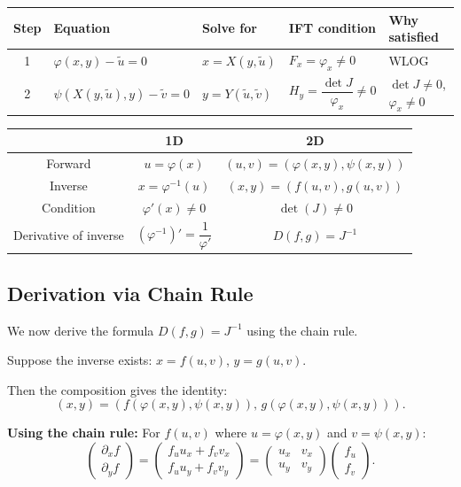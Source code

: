 \documentclass[11pt]{report}
\begin{document}
\begin{remark}
\begin{center}
\begin{tabular}{|c|l|l|l|l|}
\hline
\textbf{Step} & \textbf{Equation} & \textbf{Solve for} & \textbf{IFT condition} & \textbf{Why satisfied} \\
\hline
1 & $\varphi(x,y) - \tilde{u} = 0$ & $x = X(y, \tilde{u})$ & $F_x = \varphi_x \neq 0$ & WLOG \\
\hline
2 & $\psi(X(y,\tilde{u}),y) - \tilde{v} = 0$ & $y = Y(\tilde{u}, \tilde{v})$ & $H_y = \dfrac{\det J}{\varphi_x} \neq 0$ & $\det J \neq 0$, $\varphi_x \neq 0$ \\[6pt]
\hline
\end{tabular}
\end{center}
\end{remark}

\begin{remark}[Comparison: 1D vs 2D]
\begin{center}
\begin{tabular}{|c|c|c|}
\hline
& \textbf{1D} & \textbf{2D} \\
\hline
Forward & $u = \varphi(x)$ & $(u, v) = (\varphi(x,y), \psi(x,y))$ \\
\hline
Inverse & $x = \varphi^{-1}(u)$ & $(x, y) = (f(u, v), g(u, v))$ \\
\hline
Condition & $\varphi'(x) \neq 0$ & $\det(J) \neq 0$ \\
\hline
Derivative of inverse & $(\varphi^{-1})' = \dfrac{1}{\varphi'}$ & $D(f, g) = J^{-1}$ \\
\hline
\end{tabular}
\end{center}
\end{remark}

\subsection{Derivation via Chain Rule}

We now derive the formula $D(f, g) = J^{-1}$ using the chain rule.

Suppose the inverse exists: $x = f(u, v)$, $y = g(u, v)$.

Then the composition gives the identity:
\[
(x, y) = (f(\varphi(x,y), \psi(x,y)), \, g(\varphi(x,y), \psi(x,y))).
\]

\textbf{Using the chain rule:} For $f(u, v)$ where $u = \varphi(x,y)$ and $v = \psi(x,y)$:
\[
\begin{pmatrix} \partial_x f \\ \partial_y f \end{pmatrix} = \begin{pmatrix} f_u u_x + f_v v_x \\ f_u u_y + f_v v_y \end{pmatrix} = \begin{pmatrix} u_x & v_x \\ u_y & v_y \end{pmatrix} \begin{pmatrix} f_u \\ f_v \end{pmatrix}.
\]
\end{document}
